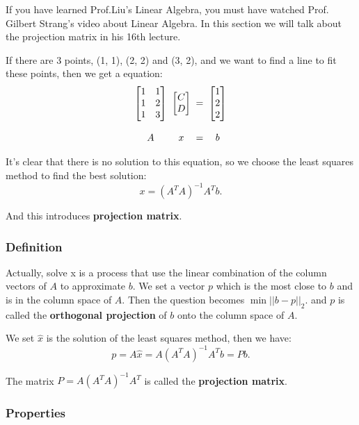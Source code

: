 \documentclass[12pt]{ctexart}
\begin{document}
If you have learned Prof.Liu's Linear Algebra, you must have watched Prof. Gilbert Strang's
video about Linear Algebra. In this section we will talk about the projection matrix in
his 16th lecture.

If there are 3 points, (1, 1), (2, 2) and (3, 2), and we want to find a line to fit these
points, then we get a equation:
\[
  \begin{array}{c@{\;\;}c@{\;\;}c@{\;\;}c}
    \begin{bmatrix}1 & 1 \\ 1 & 2 \\ 1 & 3\end{bmatrix}
    & \begin{bmatrix}C \\ D\end{bmatrix}
    & = & \begin{bmatrix}1 \\ 2 \\ 2\end{bmatrix} \\\\
    A & x & = & b
  \end{array}
\]

It's clear that there is no solution to this equation, so we choose the least squares method
to find the best solution:
\[
  x = (A^TA)^{-1}A^Tb.
\]

And this introduces \textbf{projection matrix}.

\subsubsection{\textbf{Definition}}

Actually, solve x is a process that use the linear combination of the column vectors of $A$
to approximate $b$. We set a vector $p$ which is the most close to $b$ and is in the
column space of $A$. Then the question becomes $\min ||b-p||_2$. and $p$ is called the
\textbf{orthogonal projection} of $b$ onto the column space of $A$.

We set $\hat{x}$ is the solution of the least squares method, then we have:
\[
  p = A\hat{x} = A(A^TA)^{-1}A^Tb = Pb.
\]

The matrix $P = A(A^TA)^{-1}A^T$ is called the \textbf{projection matrix}.

\subsubsection{\textbf{Properties}}
\end{document}
